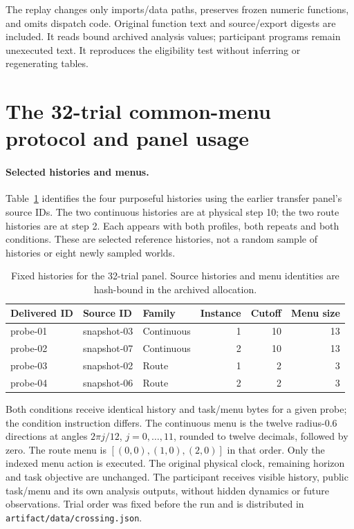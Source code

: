 The replay changes only imports/data paths, preserves frozen numeric
functions, and omits dispatch code. Original function text and
source/export digests are included. It reads bound archived analysis
values; participant programs remain unexecuted text. It reproduces the
eligibility test without inferring or regenerating tables.


\section{The 32-trial common-menu protocol and panel usage}
\label{app:common-menu-protocol}

\paragraph{Selected histories and menus.}
Table~\ref{tab:common-menu-histories} identifies the four purposeful
histories using the earlier transfer panel's source IDs. The two
continuous histories are at physical step 10; the two route histories
are at step 2. Each appears with both profiles, both repeats and both
conditions. These are selected reference histories, not a random sample
of histories or eight newly sampled worlds.

\begin{table}[htbp]
\centering\small
\begin{tabular}{lllrrr}\toprule
Delivered ID & Source ID & Family & Instance & Cutoff & Menu size\\\midrule
probe-01 & snapshot-03 & Continuous & 1 & 10 & 13\\
probe-02 & snapshot-07 & Continuous & 2 & 10 & 13\\
probe-03 & snapshot-02 & Route & 1 & 2 & 3\\
probe-04 & snapshot-06 & Route & 2 & 2 & 3\\\bottomrule
\end{tabular}
\caption{Fixed histories for the 32-trial panel. Source histories and
menu identities are hash-bound in the archived allocation.}
\label{tab:common-menu-histories}
\end{table}

Both conditions receive identical history and task/menu bytes for a
given probe; the condition instruction differs. The continuous menu
is the twelve radius-$0.6$ directions at angles $2\pi j/12$,
$j=0,\ldots,11$, rounded to twelve decimals, followed by zero.
The route menu is $[(0,0),(1,0),(2,0)]$ in that order. Only the indexed
menu action is executed. The original physical clock, remaining
horizon and task objective are unchanged. The participant receives
visible history, public task/menu and its own analysis outputs, without
hidden dynamics or future observations. Trial order was fixed before
the run and is distributed in \texttt{artifact/data/crossing.json}.


